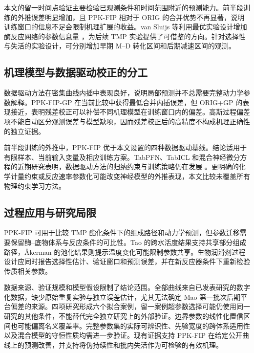本文的留一时间点验证主要检验已观测条件和时间范围附近的预测能力。前半段训练的外推误差明显增加，且 PPK-FIP 相对于 ORIG 的合并优势不再显著，说明训练窗口的信息不足会限制机理扩展的收益。van Sluijs 等利用最优实验设计增加酶反应网络的参数信息量 \cite{vansluijs2024}，为后续 TMP 实验提供了可借鉴的方向。针对选择性与失活的实验设计，可分别增加早期 M--D 转化区间和后期减速区间的观测。

\subsection{机理模型与数据驱动校正的分工}
数据驱动方法在密集曲线内插中表现良好，说明局部预测并不总需要完整动力学参数解释。PPK-FIP-GP 在当前比较中获得最低合并内插误差，但 ORIG+GP 的表现接近，表明残差校正可以补偿不同机理模型在训练窗口内的偏差。高斯过程偏差项不能自动区分观测误差与模型缺项，因而残差校正后的高精度不构成机理正确性的独立证据。

前半段训练的外推中，PPK-FIP 优于本文设置的四种数据驱动基线。结论适用于有限样本、当前输入变量及相应训练方案。TabPFN、TabICL 和混合神经微分方程的近期研究表明，数据驱动方法的归纳约束与训练策略仍在发展 \cite{hollmann2025,qu2025tabicl,giampiccolo2024}。更明确的化学计量约束或反应速率参数化可能改变神经模型的外推表现，本文比较未覆盖所有物理约束学习方法。

\subsection{过程应用与研究局限}
PPK-FIP 可用于比较 TMP 酯化条件下的组成路径和动力学预测，但参数迁移需要保留酶--底物体系与反应条件的可比性。Tao 的跨水活度结果支持共享部分组成路径，Åkerman 的池化结果则提示温度变化可能限制参数共享。生物润滑剂过程设计应同时报告选择性估计、验证窗口和预测误差，并在新反应器条件下重新检验传质相关参数。

数据来源、验证规模和模型假设限制了结论范围。全部曲线来自已发表研究的数字化数据，缺少原始重复实验与独立误差估计，尤其无法确定 Mao 第一批次后期平台偏差的来源。四项研究形成六个拟合案例，留一案例超参数选择可能仍使用同一研究的其他条件，不能替代完全独立研究上的外部验证。边界参数的线性化置信区间也可能偏离名义覆盖率。完整参数集的实际可辨识性、先验宽度的跨体系适用性以及混合模型的守恒性质均需进一步验证。现有证据支持 PPK-FIP 在给定公开曲线上的预测改善，并支持将伪持续性和批内失活作为可检验的有效机理。
